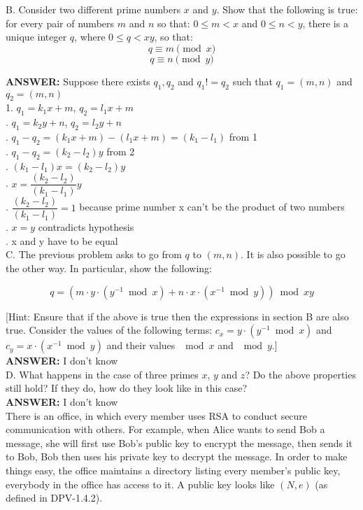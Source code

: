\documentclass{article}
\begin{document}
\noindent B. Consider two different prime numbers $x$ and $y$. Show that the
following is true: for every pair of numbers $m$ and $n$ so that: $0
\leq m < x$ and $0 \leq n < y$, there is a unique integer $q$, where
$0 \leq q < xy$, so that:
$$q \equiv m \pmod{x}$$
$$q \equiv n \pmod{y}$$

{\bfseries ANSWER: }Suppose there exists $q_1, q_2$ and $q_1 != q_2$ such that $q_1 = (m, n)$ and $q_2 = (m, n)$\\

1. $q_1 = k_1x+m$, $q_2 = l_1x+m$\\
. $q_1 = k_2y+n$, $q_2 = l_2y+n$\\
. $q_1 - q_2 = (k_1x + m) - (l_1x + m) = (k_1 - l_1)$ from 1\\
. $q_1 - q_2 = (k_2 - l_2) y$ from 2\\
. $(k_1 - l_1)x = (k_2 - l_2)y$\\
. $x=\dfrac{(k_2 - l_2)}{(k_1 - l_1)}y$\\
. $\dfrac{(k_2 - l_2)}{(k_1 - l_1)} = 1$ because prime number x can't be the product of two numbers\\
. $x = y$ contradicts hypothesis\\
. x and y have to be equal\\
  
\noindent C. The previous problem asks to go from $q$ to $(m,n)$. It is also
possible to go the other way. In particular, show the following:

$$q = ( m \cdot y \cdot (y^{-1} \bmod{x}) + n \cdot x \cdot
(x^{-1} \bmod{y}) ) \bmod{xy}$$

[Hint: Ensure that if the above is true then the expressions in section B are
  also true. Consider the values of the following terms: $c_x = y
  \cdot (y^{-1} \bmod{x})$ and $c_y = x \cdot (x^{-1} \bmod{y})$ and
their values $\mod{x}$ and $\mod{y}$.]\\

{\bfseries ANSWER: } I don't know\\

\noindent D. What happens in the case of three primes $x$, $y$ and $z$? Do the
above properties still hold? If they do, how do they look like in this
case?\\

{\bfseries ANSWER: }I don't know\\

 There is an office, in which every member
uses RSA to conduct secure communication with others.  For example,
when Alice wants to send Bob a message, she will first use Bob's
public key to encrypt the message, then sends it to Bob, Bob then uses
his private key to decrypt the message.  In order to make things easy,
the office maintains a directory listing every member's public key,
everybody in the office has access to it. A public key looks like $(N,
e)$ (as defined in DPV-1.4.2).
\end{document}
